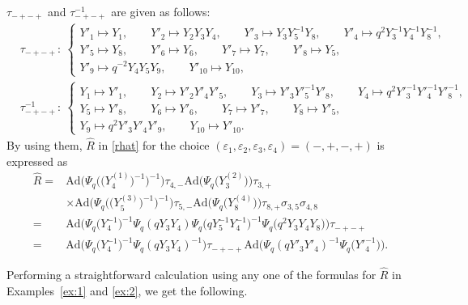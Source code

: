 \documentclass[11pt]{article}
\numberwithin{equation}{section}
\numberwithin{equation}{section}
\begin{document}
\begin{Example}\label{ex:2}
$\tau_{-+-+}$ and $\tau_{-+-+}^{-1}$ are given as follows:
\begin{align*}
&\tau_{-+-+}\colon\
\begin{cases}
Y'_1 \mapsto Y_1,\qquad
Y'_2 \mapsto Y_2Y_3Y_4, \qquad
Y'_3 \mapsto Y_3Y^{-1}_5Y_8, \qquad
Y'_4 \mapsto q^2Y^{-1}_3Y^{-1}_4Y^{-1}_8,
\\
Y'_5 \mapsto Y_8, \qquad
Y'_6 \mapsto Y_6,\qquad
Y'_7 \mapsto Y_7,\qquad
Y'_8 \mapsto Y_5,
\\
Y'_9 \mapsto q^{-2}Y_4Y_5Y_9, \qquad
Y'_{10} \mapsto Y_{10},
\end{cases}
\\
& \tau_{-+-+}^{-1}\colon\
\begin{cases}
Y_1 \mapsto Y'_1, \qquad\!
Y_2 \mapsto Y'_2Y'_4Y'_5, \qquad\!
Y_3 \mapsto Y'_3Y'^{-1}_5Y'_8, \qquad\!
Y_4 \mapsto q^2Y'^{-1}_3Y'^{-1}_4Y'^{-1}_8,
\\
Y_5 \mapsto Y'_8, \qquad
Y_6 \mapsto Y'_6, \qquad
Y_7 \mapsto Y'_7, \qquad
Y_8 \mapsto Y'_5,
\\
Y_9 \mapsto q^2Y'_3Y'_4Y'_9, \qquad
Y_{10} \mapsto Y'_{10}.
\end{cases}
\end{align*}
By using them, $\widehat{R}$ in \eqref{rhat} for the choice
$(\varepsilon_1, \varepsilon_2, \varepsilon_3, \varepsilon_4)=(-,+,-,+)$
is expressed as
\begin{align}
\widehat{R}={}&
\mathrm{Ad}\bigl(\Psi_q\bigl(\bigl(Y^{(1)}_4\bigr)^{-1}\bigr)^{-1}\bigr)\tau_{4,-}
\mathrm{Ad}\bigl(\Psi_q\bigl(Y^{(2)}_3\bigr)\bigr)\tau_{3,+}
\nonumber \\
& \times
\mathrm{Ad}\bigl(\Psi_q\bigl(\bigl(Y^{(3)}_5\bigr)^{-1}\bigr)^{-1}\bigr)\tau_{5,-}
\mathrm{Ad}\bigl(\Psi_q\bigl(Y^{(4)}_8\bigr)\bigr)\tau_{8,+}\sigma_{3,5}\sigma_{4,8}
\nonumber \\
={}&
\mathrm{Ad}\bigl(\Psi_q\bigl(Y_4^{-1}\bigr)^{-1}
\Psi_q(qY_3Y_4)
\Psi_q\bigl(qY^{-1}_5Y^{-1}_4\bigr)^{-1}
\Psi_q\bigl(q^2Y_3Y_4Y_8\bigr)\bigr)\tau_{-+-+}
\label{dode1}\\
={}&
\mathrm{Ad}\bigl(
\Psi_q\bigl(Y_4^{-1}\bigr)^{-1}
\Psi_q(qY_3Y_4)^{-1}\bigr)
\tau_{-+-+}
\mathrm{Ad}\bigl(
\Psi_q(qY'_3Y'_4)^{-1}
\Psi_q\bigl(Y'^{-1}_4\bigr)\bigr).
\label{dode2}
\end{align}
\end{Example}

Performing a straightforward calculation using any one
of the formulas for $\widehat{R}$ in Examples~\ref{ex:1} and \ref{ex:2},
we get the following.
\end{document}
